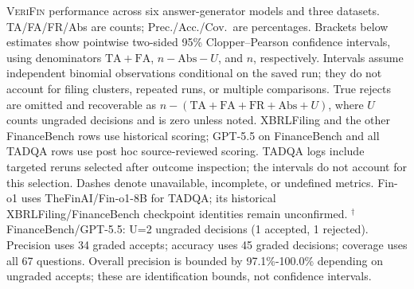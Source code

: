 \begin{table}[t]
\caption{\textsc{VeriFin} performance across six answer-generator models and three datasets. TA/FA/FR/Abs are counts; Prec./Acc./Cov.\ are percentages. Brackets below estimates show pointwise two-sided 95\% Clopper--Pearson confidence intervals, using denominators $\mathrm{TA}+\mathrm{FA}$, $n-\mathrm{Abs}-U$, and $n$, respectively. Intervals assume independent binomial observations conditional on the saved run; they do not account for filing clusters, repeated runs, or multiple comparisons. True rejects are omitted and recoverable as $n-(\mathrm{TA}+\mathrm{FA}+\mathrm{FR}+\mathrm{Abs}+U)$, where $U$ counts ungraded decisions and is zero unless noted. XBRLFiling and the other FinanceBench rows use historical scoring; GPT-5.5 on FinanceBench and all TADQA rows use post hoc source-reviewed scoring. TADQA logs include targeted reruns selected after outcome inspection; the intervals do not account for this selection. Dashes denote unavailable, incomplete, or undefined metrics. Fin-o1 uses TheFinAI/Fin-o1-8B for TADQA; its historical XBRLFiling/FinanceBench checkpoint identities remain unconfirmed. $^{\dagger}$ FinanceBench/GPT-5.5: U=2 ungraded decisions (1 accepted, 1 rejected). Precision uses 34 graded accepts; accuracy uses 45 graded decisions; coverage uses all 67 questions. Overall precision is bounded by 97.1\%-100.0\% depending on ungraded accepts; these are identification bounds, not confidence intervals.}
\label{tab:models-three-datasets}
\end{table}
